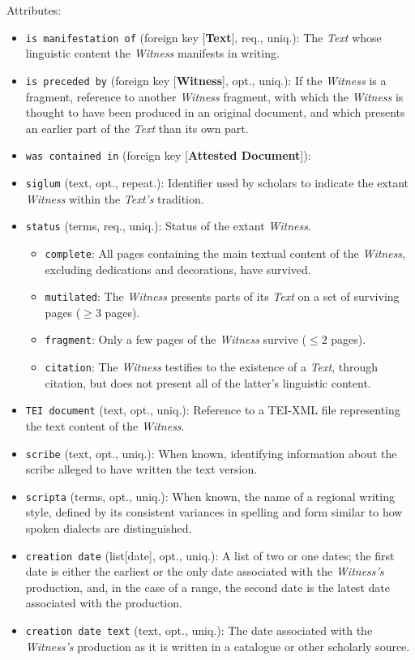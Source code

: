 \vspace{1em}
\noindent Attributes:
\begin{itemize}
    \item \texttt{is manifestation of} (foreign key [\textbf{Text}], req., uniq.): The \textit{Text} whose linguistic content the \textit{Witness} manifests in writing.
    \item \texttt{is preceded by} (foreign key [\textbf{Witness}], opt., uniq.): If the \textit{Witness} is a fragment, reference to another \textit{Witness} fragment, with which the \textit{Witness} is thought to have been produced in an original document, and which presents an earlier part of the \textit{Text} than its own part.
    \item \texttt{was contained in} (foreign key [\textbf{Attested Document}]): 
    \item \texttt{siglum} (text, opt., repeat.): Identifier used by scholars to indicate the extant \textit{Witness} within the \textit{Text's} tradition.
    \item \texttt{status} (terms, req., uniq.): Status of the extant \textit{Witness}.
    \begin{itemize}
        \item \texttt{complete}: All pages containing the main textual content of the \textit{Witness}, excluding dedications and decorations, have survived.
        \item \texttt{mutilated}: The \textit{Witness} presents parts of its \textit{Text} on a set of surviving pages ($ \geq 3 $ pages).
        \item \texttt{fragment}: Only a few pages of the \textit{Witness} survive ($ \leq 2 $ pages). 
        \item \texttt{citation}: The \textit{Witness} testifies to the existence of a \textit{Text}, through citation, but does not present all of the latter's linguistic content.
    \end{itemize}
    \item \texttt{TEI document} (text, opt., uniq.): Reference to a TEI-XML file representing the text content of the \textit{Witness}.
    \item \texttt{scribe} (text, opt., uniq.): When known, identifying information about the scribe alleged to have written the text version.
    \item \texttt{scripta} (terms, opt., uniq.): When known, the name of a regional writing style, defined by its consistent variances in spelling and form similar to how spoken dialects are distinguished.
    \item \texttt{creation date} (list[date], opt., uniq.): A list of two or one dates; the first date is either the earliest or the only date associated with the \textit{Witness's} production, and, in the case of a range, the second date is the latest date associated with the production.
    \item \texttt{creation date text} (text, opt., uniq.): The date associated with the \textit{Witness's} production as it is written in a catalogue or other scholarly source.
\end{itemize}


